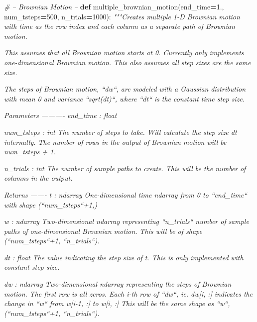 \documentclass[]{article}
\newenvironment{Shaded}{\begin{snugshade}}{\end{snugshade}}
\newcommand{\CommentTok}[1]{\textcolor[rgb]{0.56,0.35,0.01}{\textit{#1}}}
\newcommand{\DecValTok}[1]{\textcolor[rgb]{0.00,0.00,0.81}{#1}}
\newcommand{\FloatTok}[1]{\textcolor[rgb]{0.00,0.00,0.81}{#1}}
\newcommand{\KeywordTok}[1]{\textcolor[rgb]{0.13,0.29,0.53}{\textbf{#1}}}
\newcommand{\NormalTok}[1]{#1}
\newcommand{\OperatorTok}[1]{\textcolor[rgb]{0.81,0.36,0.00}{\textbf{#1}}}
\begin{document}
\begin{Shaded}
\begin{Highlighting}[]
\CommentTok{# -- Brownian Motion --}
\KeywordTok{def}\NormalTok{ multiple_brownian_motion(end_time}\OperatorTok{=}\FloatTok{1.}\NormalTok{, num_tsteps}\OperatorTok{=}\DecValTok{500}\NormalTok{, n_trials}\OperatorTok{=}\DecValTok{1000}\NormalTok{):}
    \CommentTok{"""Creates multiple 1-D Brownian motion with time as the row index and}
\CommentTok{    each column as a separate path of Brownian motion.}

\CommentTok{    This assumes that all Brownian motion starts at 0. Currently only}
\CommentTok{    implements one-dimensional Brownian motion. This also assumes all}
\CommentTok{    step sizes are the same size.}

\CommentTok{    The steps of Brownian motion, ``dw``, are modeled with a Gaussian}
\CommentTok{    distribution with mean 0 and variance ``sqrt(dt)``, where ``dt``}
\CommentTok{    is the constant time step size.}

\CommentTok{    Parameters}
\CommentTok{    ----------}
\CommentTok{    end_time : float}

\CommentTok{    num_tsteps : int}
\CommentTok{        The number of steps to take. Will calculate the step}
\CommentTok{        size dt internally. The number of rows in the output of}
\CommentTok{        Brownian motion will be num_tsteps + 1.}

\CommentTok{    n_trials : int}
\CommentTok{        The number of sample paths to create. This will be the number}
\CommentTok{        of columns in the output.}

\CommentTok{    Returns}
\CommentTok{    -------}
\CommentTok{    t : ndarray}
\CommentTok{        One-dimensional time ndarray from 0 to ``end_time`` with}
\CommentTok{        shape (``num_tsteps``+1,)}

\CommentTok{    w : ndarray}
\CommentTok{        Two-dimensional ndarray representing ``n_trials`` number of}
\CommentTok{        sample paths of one-dimensional Brownian motion.}
\CommentTok{        This will be of shape (``num_tsteps``+1, ``n_trials``).}

\CommentTok{    dt : float}
\CommentTok{        The value indicating the step size of t. This is only implemented}
\CommentTok{        with constant step size.}

\CommentTok{    dw : ndarray}
\CommentTok{        Two-dimensional ndarray representing the steps of Brownian motion.}
\CommentTok{        The first row is all zeros. Each i-th row of ``dw``, ie. dw[i, :]}
\CommentTok{        indicates the change in ``w`` from w[i-1, :] to w[i, :]}
\CommentTok{        This will be the same shape as ``w``, (``num_tsteps``+1, ``n_trials``).}


\end{Highlighting}
\end{Shaded}
\end{document}
